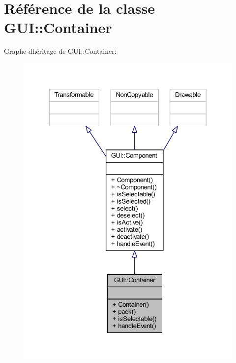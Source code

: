 \hypertarget{class_g_u_i_1_1_container}{}\section{Référence de la classe G\+UI\+:\+:Container}
\label{class_g_u_i_1_1_container}


Graphe d\textquotesingle{}héritage de G\+UI\+:\+:Container\+:\nopagebreak
\begin{figure}[H]
\begin{center}
\leavevmode
\includegraphics[width=324pt]{class_g_u_i_1_1_container__inherit__graph}
\end{center}
\end{figure}


